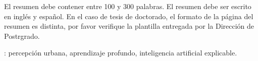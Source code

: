 El resumen debe contener entre 100 y 300 palabras. El resumen debe ser escrito en ingl\'es y espa\~nol.  En el caso de tesis de doctorado, el formato de la p\'agina del resumen es distinta, por favor verifique la plantilla entregada por la Direcci\'on de Postrgrado.\

\vfill
{}: percepción urbana, aprendizaje profundo, inteligencia artificial explicable.
